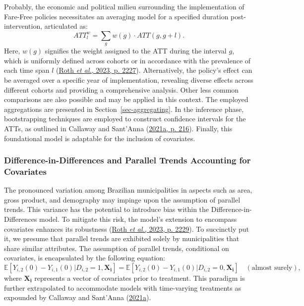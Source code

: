 \documentclass[12pt, a4paper, twoside]{article}
\numberwithin{equation}{subsection} %
\begin{document}
Probably, the economic and political milieu surrounding the
implementation of Fare-Free policies necessitates an averaging model for
a specified duration post-intervention, articulated as:
\begin{equation} 
\label{eq-att-estimator-avg}
    ATT_{l}^{w} = \sum_{g} w(g) \cdot ATT(g, g + l).
\end{equation} Here, \(w(g)\) signifies the weight assigned to the ATT
during the interval \(g\), which is uniformly defined across cohorts or
in accordance with the prevalence of each time span \(l\)
(\protect\hyperlink{ref-roth_whats_2023}{Roth \emph{et al.}, 2023, p.
2227}). Alternatively, the policy's effect can be averaged over a
specific year of implementation, revealing diverse effects across
different cohorts and providing a comprehensive analysis. Other less
common comparisons are also possible and may be applied in this context.
The employed aggregations are presented in
Section~\ref{sec-aggregating}. In the inference phase, bootstrapping
techniques are employed to construct confidence intervals for the ATTs,
as outlined in Callaway and Sant'Anna
(\protect\hyperlink{ref-CALLAWAY2021200}{2021a, p. 216}). Finally, this
foundational model is adaptable for the inclusion of covariates.

\hypertarget{sec-did-covariates}{%
\subsubsection{Difference-in-Differences and Parallel Trends Accounting
for Covariates}\label{sec-did-covariates}}

The pronounced variation among Brazilian municipalities in aspects such
as area, gross product, and demography may impinge upon the assumption
of parallel trends. This variance has the potential to introduce bias
within the Difference-in-Differences model. To mitigate this risk, the
model's extension to encompass covariates enhances its robustness
(\protect\hyperlink{ref-roth_whats_2023}{Roth \emph{et al.}, 2023, p.
2229}). To succinctly put it, we presume that parallel trends are
exhibited solely by municipalities that share similar attributes. The
assumption of parallel trends, conditional on covariates, is
encapsulated by the following equation: \begin{equation}
\label{eq-parallel-trend-cond}
   \mathbb{E}[Y_{i,2}(0) - Y_{i,1}(0) | D_{i,2} = 1, \boldsymbol{X_i}] = \mathbb{E}[Y_{i,2}(0) - Y_{i,1}(0) | D_{i,2} = 0, \boldsymbol{X_i}] \quad (\text{almost surely}),
\end{equation} where \(\boldsymbol{X_i}\) represents a vector of
covariates prior to treatment. This paradigm is further extrapolated to
accommodate models with time-varying treatments as expounded by Callaway
and Sant'Anna (\protect\hyperlink{ref-CALLAWAY2021200}{2021a}).
\end{document}
